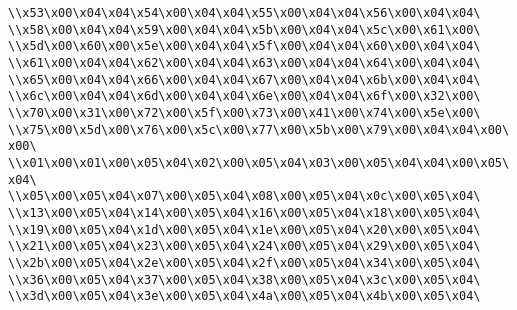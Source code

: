 \verb|\\x53\x00\x04\x04\x54\x00\x04\x04\x55\x00\x04\x04\x56\x00\x04\x04\|\newline
\verb|\\x58\x00\x04\x04\x59\x00\x04\x04\x5b\x00\x04\x04\x5c\x00\x61\x00\|\newline
\verb|\\x5d\x00\x60\x00\x5e\x00\x04\x04\x5f\x00\x04\x04\x60\x00\x04\x04\|\newline
\verb|\\x61\x00\x04\x04\x62\x00\x04\x04\x63\x00\x04\x04\x64\x00\x04\x04\|\newline
\verb|\\x65\x00\x04\x04\x66\x00\x04\x04\x67\x00\x04\x04\x6b\x00\x04\x04\|\newline
\verb|\\x6c\x00\x04\x04\x6d\x00\x04\x04\x6e\x00\x04\x04\x6f\x00\x32\x00\|\newline
\verb|\\x70\x00\x31\x00\x72\x00\x5f\x00\x73\x00\x41\x00\x74\x00\x5e\x00\|\newline
\verb|\\x75\x00\x5d\x00\x76\x00\x5c\x00\x77\x00\x5b\x00\x79\x00\x04\x04\x00\x00\|\newline
\verb|\\x01\x00\x01\x00\x05\x04\x02\x00\x05\x04\x03\x00\x05\x04\x04\x00\x05\x04\|\newline
\verb|\\x05\x00\x05\x04\x07\x00\x05\x04\x08\x00\x05\x04\x0c\x00\x05\x04\|\newline
\verb|\\x13\x00\x05\x04\x14\x00\x05\x04\x16\x00\x05\x04\x18\x00\x05\x04\|\newline
\verb|\\x19\x00\x05\x04\x1d\x00\x05\x04\x1e\x00\x05\x04\x20\x00\x05\x04\|\newline
\verb|\\x21\x00\x05\x04\x23\x00\x05\x04\x24\x00\x05\x04\x29\x00\x05\x04\|\newline
\verb|\\x2b\x00\x05\x04\x2e\x00\x05\x04\x2f\x00\x05\x04\x34\x00\x05\x04\|\newline
\verb|\\x36\x00\x05\x04\x37\x00\x05\x04\x38\x00\x05\x04\x3c\x00\x05\x04\|\newline
\verb|\\x3d\x00\x05\x04\x3e\x00\x05\x04\x4a\x00\x05\x04\x4b\x00\x05\x04\|\newline
